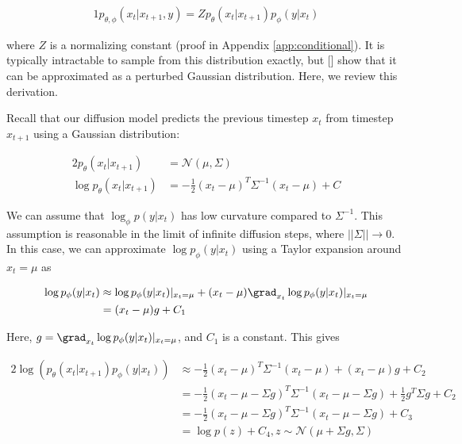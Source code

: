 \begin{alignat}{1}
p_{\theta,\phi}(x_t|x_{t+1},y) = Z p_{\theta}(x_t|x_{t+1})p_{\phi}(y|x_t) \label{eq:normalizedtransition}
\end{alignat}

where $Z$ is a normalizing constant (proof in Appendix \ref{app:conditional}). It is typically intractable to sample from this distribution exactly, but \citeauthor{dickstein} [] show that it can be approximated as a perturbed Gaussian distribution. Here, we review this derivation.

Recall that our diffusion model predicts the previous timestep $x_t$ from timestep $x_{t+1}$ using a Gaussian distribution:

\begin{alignat}{2}
p_{\theta}(x_t|x_{t+1}) &= \mathcal{N}(\mu, \Sigma) \\
\log p_{\theta}(x_t|x_{t+1}) &= -\frac{1}{2} (x_t - \mu)^T \Sigma^{-1} (x_t - \mu) + C
\end{alignat}

We can assume that $\log_{\phi} p(y|x_t)$ has low curvature compared to $\Sigma^{-1}$. This assumption is reasonable in the limit of infinite diffusion steps, where $||\Sigma|| \to 0$. In this case, we can approximate $\log p_{\phi}(y|x_t)$ using a Taylor expansion around $x_t = \mu$ as

\begin{alignat}{2}
\log p_{\phi}(y|x_t) &\approx \log p_{\phi}(y|x_t)|_{x_t = \mu} + (x_t - \mu)\grad_{x_t} \log p_{\phi}(y|x_t)|_{x_t = \mu} \\
&= (x_t - \mu)g + C_1 
\end{alignat}

Here, $g = \grad_{x_t} \log p_{\phi}(y|x_t)|_{x_t = \mu}$, and $C_1$ is a constant. This gives

\begin{alignat}{2}
    \log(p_{\theta}(x_t|x_{t+1}) p_{\phi}(y|x_t)) &\approx -\frac{1}{2} (x_t - \mu)^T \Sigma^{-1} (x_t - \mu) + (x_t - \mu)g + C_2 \\
    &= - \frac{1}{2} (x_t - \mu - \Sigma g)^T \Sigma^{-1} (x_t - \mu - \Sigma g) + \frac{1}{2} g^T \Sigma g + C_2 \\
    &= - \frac{1}{2} (x_t - \mu - \Sigma g)^T \Sigma^{-1} (x_t - \mu - \Sigma g) + C_3 \\
    &= \log p(z) + C_4, z \sim \mathcal{N}(\mu + \Sigma g, \Sigma)
    \label{eq:condsamp}
\end{alignat}

